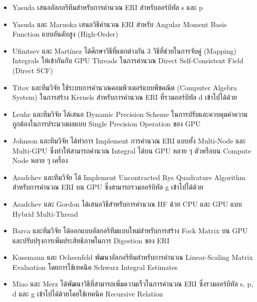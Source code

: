 \begin{itemize}[topsep=0pt,noitemsep]
  \setlength\itemsep{0.5em}
  \item Yasuda เสนออัลกอริทึมสำหรับการคำนวณ ERI สำหรับออร์บิทัล s และ p\autocite{yasuda2008}

  \item Yasuda และ Maruoka เสนอวิธีคำนวณ ERI สำหรับ Angular Moment Basis Function แบบอันดับสูง (High-Order)\autocite{yasuda2014}

  \item Ufimtsev และ Martínez ได้ศึกษาวิธีที่แตกต่างกัน 3 วิธีที่ช่วยในการจับคู่ (Mapping) Integrals ให้เข้ากันกับ GPU Threads\autocite{ufimtsev2008} ในการคำนวณ Direct Self-Consistent Field (Direct SCF)\autocite{ufimtsev2009}

  \item Titov และทีมวิจัย ใช้ระบบการคำนวณคอมพิวเตอร์แบบพีชคณิต (Computer Algebra System) ในการสร้าง Kernels สำหรับการคำนวณ ERI ที่รวมออร์บิทัล d เข้าไปได้ด้วย\autocite{titov2013}

  \item Leuhr และทีมวิจัย ได้เสนอ Dynamic Precision Scheme ในการปรับและควบคุมค่าความถูกต้องในการประมวลผลแบบ Single Precision Operation ของ GPU\autocite{luehr2011}

  \item Johnson และทีมวิจัย ได้ทำการ Implement การคำนวณ ERI แบบทั้ง Multi-Node และ Multi-GPU ซึ่งทำให้สามารถคำนวณ Integral ได้บน GPU หลาย ๆ ตัวหรือบน Compute Node หลาย ๆ เครื่อง\autocite{johnson2022}

  \item Asadchev และทีมวิจัย ได้ Implement Uncontracted Rys Quadrature Algorithm สำหรับการคำนวณ ERI บน GPU ซึ่งสามารถรวมออร์บิทัล g เข้าไปได้ด้วย\autocite{asadchev2010}

  \item Asadchev และ Gordon ได้เสนอวิธีสำหรับการคำนวณ HF ด้วย CPU และ GPU แบบ Hybrid Multi-Thread\autocite{asadchev2012}

  \item Barca และทีมวิจัย ได้ออกแบบอัลกอริทึมแบบใหม่สำหรับการสร้าง Fock Matrix บน GPU\autocite{barca2020} และปรับปรุงการเพิ่มประสิทธิภาพในการ Digestion ของ ERI\autocite{barca2021}

  \item Kussmann และ Ochsenfeld พัฒนาอัลกอริทึมสำหรับการคำนวณ Linear-Scaling Matrix Evaluation โดยการใช้เทคนิค Schwarz Integral Estimates\autocite{kussmann2013}

  \item Miao และ Merz ได้พัฒนาวิธีที่สามารถเพิ่มความเร็วในการคำนวณ ERI ซึ่งรวมออร์บิทัล s, p, d\autocite{miao2013} และ g เข้าไปได้ด้วยโดยใช้เทคนิค Recursive Relation\autocite{miao2015}


\end{itemize}
